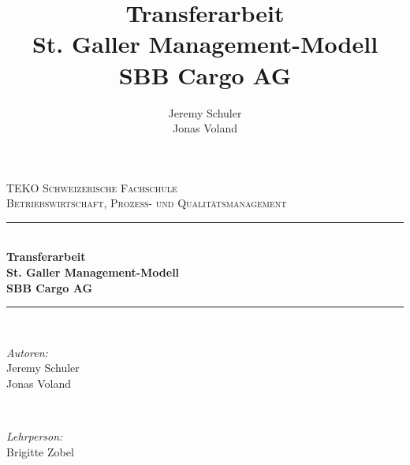 \documentclass{article}
\title{
    Transferarbeit
    \\St. Galler Management-Modell
    \\SBB Cargo AG}
\author{
    Jeremy Schuler\\
    Jonas Voland
}
\begin{document}
\begin{titlepage}

\newcommand{\HRule}{\rule{\linewidth}{0.5mm}} %

\center %
    

\textsc{\LARGE TEKO Schweizerische Fachschule}\\[1.5cm] %
\textsc{\Large Betriebswirtschaft, Prozess- und Qualitätsmanagement}\\[0.5cm] %


\HRule \\[0.4cm]
{ \huge \bfseries Transferarbeit
\\St. Galler Management-Modell
\\SBB Cargo AG}\\[0.4cm] %
\HRule \\[1.5cm]
    

\begin{minipage}{0.4\textwidth}
\begin{flushleft} \large
\emph{Autoren:}\\
Jeremy Schuler\\
Jonas Voland
\end{flushleft}
\end{minipage}
~
\begin{minipage}{0.4\textwidth}
\begin{flushright} \large
\emph{Lehrperson:} \\
Brigitte Zobel
\end{flushright}
\end{minipage}\\[2cm]



\end{titlepage}
\end{document}
